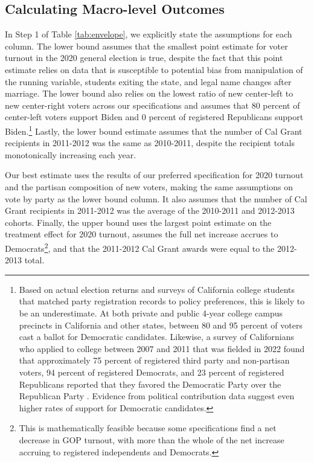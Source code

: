 \documentclass[12pt,letterpaper,oneside]{book}
\begin{document}
    \clearpage

    \subsection{Calculating Macro-level Outcomes}\label{sec:macro}


    In Step 1 of Table \ref{tab:envelope}, we explicitly state the assumptions for each column. The lower bound assumes that the smallest point estimate for voter turnout in the 2020 general election is true, despite the fact that this point estimate relies on data that is  susceptible to potential bias from manipulation of the running variable, students exiting the state, and legal name changes after marriage. The lower bound also relies on the lowest ratio of new center-left to new center-right voters across our specifications and assumes that 80 percent of center-left voters support Biden and 0 percent of registered Republicans support Biden.\footnote{Based on actual election returns and surveys of California college students that matched party registration records to policy preferences, this is likely to be an underestimate. At both private and public 4-year college campus precincts in California and other states, between 80 and 95 percent of voters cast a ballot for Democratic candidates. Likewise, a survey of Californians who applied to college between 2007 and 2011 that was fielded in 2022 found that approximately 75 percent of registered third party and non-partisan voters, 94 percent of registered Democrats, and 23 percent of registered Republicans reported that they favored the Democratic Party over the Republican Party \citep{firoozi_effect_2023}. Evidence from political contribution data suggest even higher rates of support for Democratic candidates.} Lastly, the lower bound estimate assumes that the number of Cal Grant recipients in 2011-2012 was the same as 2010-2011, despite the recipient totals monotonically increasing each year.

    Our best estimate uses the results of our preferred specification for 2020 turnout and the partisan composition of new voters, making the same assumptions on vote by party as the lower bound column. It also assumes that the number of Cal Grant recipients in 2011-2012 was the average of the 2010-2011 and 2012-2013 cohorts. Finally, the upper bound uses the largest point estimate on the treatment effect for 2020 turnout, assumes the full net increase accrues to Democrats\footnote{This is mathematically feasible because some specifications find a net decrease in GOP turnout, with more than the whole of the net increase accruing to registered independents and Democrats.}, and that the 2011-2012 Cal Grant awards were equal to the 2012-2013 total.
\end{document}
